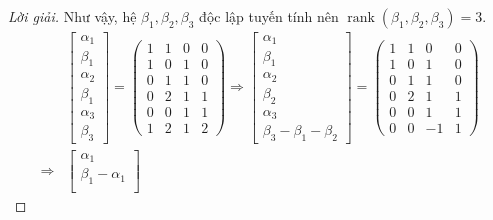 \begin{proof}[Lời giải]
    Như vậy, hệ $\beta_{1}, \beta_{2}, \beta_{3}$ độc lập tuyến tính nên $\operatorname{rank}(\beta_{1}, \beta_{2}, \beta_{3}) = 3$.
    \begin{align*}
                        & \begin{bmatrix}
                              \alpha_{1} \\
                              \beta_{1}  \\
                              \alpha_{2} \\
                              \beta_{1}  \\
                              \alpha_{3} \\
                              \beta_{3}
                          \end{bmatrix}=
        \begin{pmatrix}
            1 & 1 & 0 & 0 \\
            1 & 0 & 1 & 0 \\
            0 & 1 & 1 & 0 \\
            0 & 2 & 1 & 1 \\
            0 & 0 & 1 & 1 \\
            1 & 2 & 1 & 2
        \end{pmatrix}
        \Longrightarrow
        \begin{bmatrix}
            \alpha_{1} \\
            \beta_{1}  \\
            \alpha_{2} \\
            \beta_{2}  \\
            \alpha_{3} \\
            \beta_{3} - \beta_{1} - \beta_{2}
        \end{bmatrix}=
        \begin{pmatrix}
            1 & 1 & 0  & 0 \\
            1 & 0 & 1  & 0 \\
            0 & 1 & 1  & 0 \\
            0 & 2 & 1  & 1 \\
            0 & 0 & 1  & 1 \\
            0 & 0 & -1 & 1
        \end{pmatrix}                   \\
        \Longrightarrow &
        \begin{bmatrix}
            \alpha_{1}              \\
            \beta_{1} - \alpha_{1}  \\

\end{bmatrix}
\end{align*}
\end{proof}
